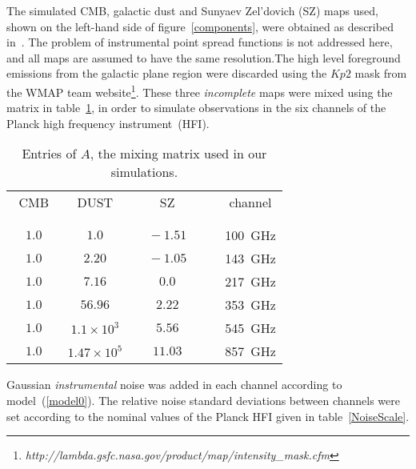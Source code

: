 The simulated CMB, galactic dust and Sunyaev Zel'dovich (SZ) maps used, shown on the left-hand side of figure~\ref{components}, were obtained as 
described in~\cite{ica:Del2003}. The problem of instrumental point spread functions is not addressed here, and all maps are assumed to have the 
same resolution.The high level foreground emissions from the galactic plane region were discarded using the $Kp2$ mask from the WMAP team 
website\footnote{\emph{http://lambda.gsfc.nasa.gov/product/map/intensity\_mask.cfm}}. These three \emph{incomplete} maps were mixed using the matrix 
in table~\ref{MatrixA}, in order to simulate observations in the six channels of the Planck high frequency instrument~(HFI).

\begin{table}[!h]
  \begin{center}
   \footnotesize {
    \begin{tabular}{@{} cccc|c @{}}
      CMB & DUST & SZ &  & channel \\
      & & & &\\
      \hline
      & & & &\\
      $\quad1.0\quad$  &  $ 1.0 $    		&  $\quad-1.51\quad$	 	&& 100~GHz\\
      $\quad1.0 \quad$ & $ 2.20$   		& $\quad-1.05\quad$  		&& 143~GHz\\
      $\quad1.0 \quad$ &  $ 7.16 $  		& $\quad0.0\quad $ 			&& 217~GHz\\
      $\quad1.0 \quad$ &   $56.96 $		&  $\quad 2.22\quad$ 	&&353~GHz\\
      $\quad1.0 \quad$ &  $1.1\times10^{3}$ 		&   $\quad5.56\quad$  	&&545~GHz\\
      $\quad1.0\quad $ &  $1.47\times10^{5}$  	& $ \quad11.03\quad $	&& 857~GHz\\
    \end{tabular}}
    \caption{Entries of $A$, the mixing matrix used in our simulations.}\label{MatrixA}
  \end{center}
\end{table}

Gaussian \emph{instrumental} noise was added in each channel according to model~(\ref{model0}). The relative noise standard deviations between channels 
were set according to the nominal values of the Planck HFI given in table~\ref{NoiseScale}. 

